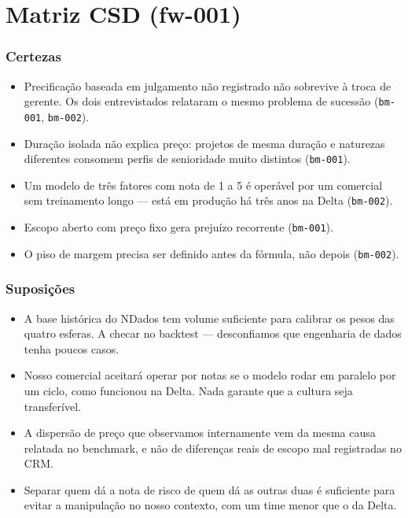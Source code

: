
\clearpage
\section{Matriz CSD (fw-001)}



\subsubsection{Certezas}

\begin{itemize}
  \item Precificação baseada em julgamento não registrado não sobrevive à troca de gerente. Os dois entrevistados relataram o mesmo problema de sucessão (\texttt{bm-001}, \texttt{bm-002}).
  \item Duração isolada não explica preço: projetos de mesma duração e naturezas diferentes consomem perfis de senioridade muito distintos (\texttt{bm-001}).
  \item Um modelo de três fatores com nota de 1 a 5 é operável por um comercial sem treinamento longo — está em produção há três anos na Delta (\texttt{bm-002}).
  \item Escopo aberto com preço fixo gera prejuízo recorrente (\texttt{bm-001}).
  \item O piso de margem precisa ser definido antes da fórmula, não depois (\texttt{bm-002}).
\end{itemize}

\subsubsection{Suposições}

\begin{itemize}
  \item A base histórica do NDados tem volume suficiente para calibrar os pesos das quatro esferas. A checar no backtest — desconfiamos que engenharia de dados tenha poucos casos.
  \item Nosso comercial aceitará operar por notas se o modelo rodar em paralelo por um ciclo, como funcionou na Delta. Nada garante que a cultura seja transferível.
  \item A dispersão de preço que observamos internamente vem da mesma causa relatada no benchmark, e não de diferenças reais de escopo mal registradas no CRM.
  \item Separar quem dá a nota de risco de quem dá as outras duas é suficiente para evitar a manipulação no nosso contexto, com um time menor que o da Delta.
\end{itemize}

